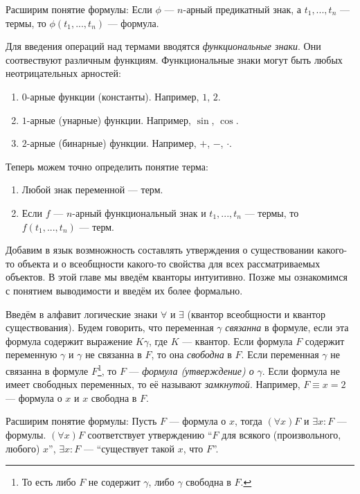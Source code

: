 Расширим понятие формулы: Если $\phi$ --- $n$-арный предикатный знак,
а $t_1,...,t_{n}$ --- термы, то $\phi(t_1,...,t_{n})$ --- формула.

Для введения операций над термами вводятся {\it функциональные знаки}.
Они соотвествуют различным функциям. Функциональные знаки могут быть любых
неотрицательных арностей:
\begin{enumerate}
	\item{}$0$-арные функции (константы). Например, $1$, $2$.
	\item{}$1$-арные (унарные) функции. Например, $\sin$, $\cos$.
	\item{}$2$-арные (бинарные) функции. Например, $+$, $-$, $\cdot$.
\end{enumerate}

Теперь можем точно определить понятие терма:
\begin{enumerate}
	\item{}Любой знак переменной --- терм.
	\item{}Если $f$ --- $n$-арный функциональный знак и $t_1,...,t_{n}$ --- термы,
	то $f(t_1,...,t_{n})$ --- терм.
\end{enumerate}


Добавим в язык возмножность составлять утверждения о существовании
какого-то объекта и о всеобщности какого-то свойства для всех рассматриваемых объектов.
В этой главе мы введём кванторы интуитивно. Позже мы ознакомимся с понятием
выводимости и введём их более формально.

Введём в алфавит логические знаки $\forall$ и $\exists$ (квантор всеобщности и
квантор существования). Будем говорить, что переменная $\gamma$
{\it связанна} в формуле, если эта формула содержит выражение $K\gamma$,
где $K$ --- квантор. Если формула $F$ содержит переменную $\gamma$ и $\gamma$
не связанна в $F$, то она {\it свободна} в $F$. Если переменная $\gamma$
не связанна в формуле $F$\footnote{
	То есть либо $F$ не содержит $\gamma$, либо $\gamma$ свободна в $F$.
}, то $F$ --- {\it формула (утверждение) о} $\gamma$. Если формула не имеет
свободных переменных, то её называют {\it замкнутой}.
Например, $F\equiv x=2$ --- формула о $x$ и $x$ свободна в $F$.

\pagebreak

Расширим понятие формулы: Пусть $F$ --- формула о $x$, тогда $(\forall x)F$
и $\exists x:F$ --- формулы.
$(\forall x)F$ соответствует
утверждению ``$F$ для всякого (произвольного, любого) $x$'', $\exists x:F$ ---
``существует такой $x$, что $F$''.

